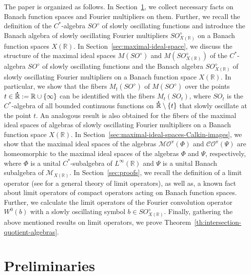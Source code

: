 \documentclass{birkjour}
\numberwithin{equation}{section}
\newcommand{\R}{\mathbb{R}}
\newcommand{\cM}{\mathcal{M}}
\newcommand{\dR}{{\bf\dot{\R}}}
\begin{document}
The paper is organized as follows.
In Section~\ref{sec:preliminaries}, we collect necessary facts on Banach
function spaces and Fourier multipliers on them. Further, we recall the
definition of the $C^*$-algebra $SO^\diamond$ of slowly oscillating functions
and introduce the Banach algebra of slowly oscillating Fourier multipliers
$SO_{X(\R)}^\diamond$ on a Banach function spaces $X(\R)$.
In Section~\ref{sec:maximal-ideal-space}, we discuss the structure of the
maximal ideal
spaces $M(SO^\diamond)$ and $M(SO_{X(\R)}^\diamond)$ of the $C^*$-algebra
$SO^\diamond$ of slowly oscillating functions and the Banach algebra
$SO_{X(\R)}^\diamond$ of slowly oscillating Fourier multipliers
on a Banach function space $X(\R)$.
In particular, we show that the fibers $M_t(SO^\diamond)$
of $M(SO^\diamond)$ over the points $t\in\dR:=\R\cup\{\infty\}$
can be identified with the fibers $M_t(SO_t)$, where $SO_t$ is the
$C^*$-algebra of all bounded continuous functions on
$\dR\setminus\{t\}$ that slowly oscillate at the point $t$.
An analogous result is also obtained for the fibers of the maximal
ideal spaces of algebras of slowly oscillating
Fourier multipliers on a Banach function space $X(\R)$.
In Section~\ref{sec:maximal-ideal-spaces-Calkin-images}, we show that
the maximal ideal spaces of the algebras $\mathcal{MO}^\pi(\Phi)$
and $\mathcal{CO}^\pi(\Psi)$ are homeomorphic to the maximal ideal
spaces of the algebras $\Phi$ and $\Psi$, respectively,
where $\Phi$ is a unital $C^*$-subalgebra of $L^\infty(\R)$ and
$\Psi$ is a unital Banach subalgebra of $\cM_{X(\R)}$.
In Section~\ref{sec:proofs}, we recall the definition of a limit operator
(see \cite{RRS04} for a general theory of limit operators), as well as,
{a known fact about limit operators of compact operators
acting} on Banach function spaces. Further, we calculate the limit operators
of the Fourier convolution operator $W^0(b)$ with a slowly oscillating symbol
$b\in SO_{X(\R)}^\diamond$. Finally, gathering the above mentioned results
on limit operators, we prove Theorem~\ref{th:intersection-quotient-algebras}.
\section{Preliminaries}\label{sec:preliminaries}
\end{document}
